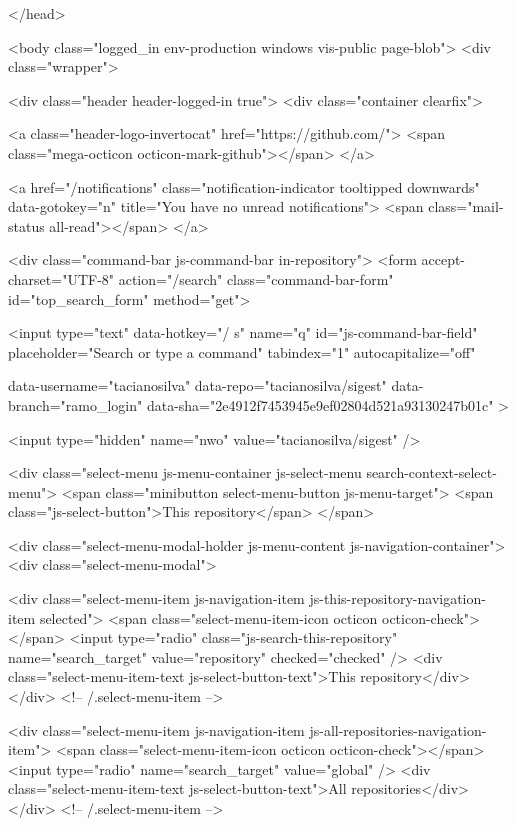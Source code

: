   </head>


  <body class="logged_in  env-production windows vis-public  page-blob">
    <div class="wrapper">
      
      
      


      <div class="header header-logged-in true">
  <div class="container clearfix">

    <a class="header-logo-invertocat" href="https://github.com/">
  <span class="mega-octicon octicon-mark-github"></span>
</a>

    
    <a href="/notifications" class="notification-indicator tooltipped downwards" data-gotokey="n" title="You have no unread notifications">
        <span class="mail-status all-read"></span>
</a>

      <div class="command-bar js-command-bar  in-repository">
          <form accept-charset="UTF-8" action="/search" class="command-bar-form" id="top_search_form" method="get">

<input type="text" data-hotkey="/ s" name="q" id="js-command-bar-field" placeholder="Search or type a command" tabindex="1" autocapitalize="off"
    
    data-username="tacianosilva"
      data-repo="tacianosilva/sigest"
      data-branch="ramo_login"
      data-sha="2e4912f7453945e9ef02804d521a93130247b01c"
  >

    <input type="hidden" name="nwo" value="tacianosilva/sigest" />

    <div class="select-menu js-menu-container js-select-menu search-context-select-menu">
      <span class="minibutton select-menu-button js-menu-target">
        <span class="js-select-button">This repository</span>
      </span>

      <div class="select-menu-modal-holder js-menu-content js-navigation-container">
        <div class="select-menu-modal">

          <div class="select-menu-item js-navigation-item js-this-repository-navigation-item selected">
            <span class="select-menu-item-icon octicon octicon-check"></span>
            <input type="radio" class="js-search-this-repository" name="search_target" value="repository" checked="checked" />
            <div class="select-menu-item-text js-select-button-text">This repository</div>
          </div> <!-- /.select-menu-item -->

          <div class="select-menu-item js-navigation-item js-all-repositories-navigation-item">
            <span class="select-menu-item-icon octicon octicon-check"></span>
            <input type="radio" name="search_target" value="global" />
            <div class="select-menu-item-text js-select-button-text">All repositories</div>
          </div> <!-- /.select-menu-item -->

